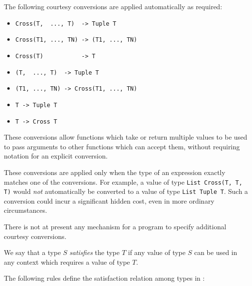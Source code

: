 The following courtesy conversions are applied automatically as required:
\begin{itemize}
\item \verb"Cross(T,  ..., T)  -> Tuple T"
\item \verb"Cross(T1, ..., TN) -> (T1, ..., TN)"
\item \verb"Cross(T)           -> T"
\vskip 2mm

\item \verb"(T,  ..., T)  -> Tuple T"
\item \verb"(T1, ..., TN) -> Cross(T1, ..., TN)"
\vskip 2mm

\item \verb"T -> Tuple T"
\item \verb"T -> Cross T"
\end{itemize}

These conversions allow functions which take or return multiple values
to be used to pass arguments to other functions which can accept them,
without requiring notation for an explicit conversion.

These conversions are applied only when the type of an expression exactly 
matches one of the conversions.
For example, a value of type \verb"List Cross(T, T, T)"
would {\em not\/} automatically be
converted to a value of type \verb"List Tuple T".
Such a conversion could incur a significant hidden cost, even in
more ordinary circumstances.

There is not at present any mechanism for a program to specify additional
courtesy conversions.


We say that a type $S$ {\em satisfies\/} the type $T$ if any value of
type $S$ can be used in any context which requires a value of type $T$.

The following rules define the satisfaction relation among types in
\asharp{}:

